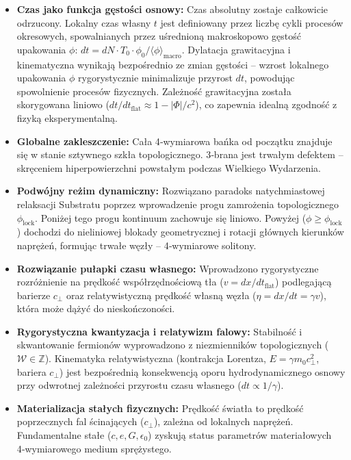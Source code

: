 \documentclass[
  letterpaper,
  DIV=11,
  numbers=noendperiod]{scrartcl}
\providecommand{\tightlist}{%
  \setlength{\itemsep}{0pt}\setlength{\parskip}{0pt}}
\numberwithin{equation}{subsection}
\begin{document}
\begin{itemize}
\tightlist
\item
  \textbf{Czas jako funkcja gęstości osnowy:} Czas absolutny zostaje
  całkowicie odrzucony. Lokalny czas własny \(t\) jest definiowany przez
  liczbę cykli procesów okresowych, spowalnianych przez uśrednioną
  makroskopowo gęstość upakowania \(\phi\):
  \(dt = dN \cdot T_0 \cdot \phi_0/\langle\phi\rangle_{\text{macro}}\).
  Dylatacja grawitacyjna i kinematyczna wynikają bezpośrednio ze zmian
  gęstości -- wzrost lokalnego upakowania \(\phi\) rygorystycznie
  minimalizuje przyrost \(dt\), powodując spowolnienie procesów
  fizycznych. Zależność grawitacyjna została skorygowana liniowo
  (\(dt/dt_{\text{flat}} \approx 1 - |\Phi|/c^2\)), co zapewnia idealną
  zgodność z fizyką eksperymentalną.
\item
  \textbf{Globalne zakleszczenie:} Cała 4‑wymiarowa bańka od początku
  znajduje się w stanie sztywnego szkła topologicznego. 3‑brana jest
  trwałym defektem -- skręceniem hiperpowierzchni powstałym podczas
  Wielkiego Wydarzenia.
\item
  \textbf{Podwójny reżim dynamiczny:} Rozwiązano paradoks
  natychmiastowej relaksacji Substratu poprzez wprowadzenie progu
  zamrożenia topologicznego \(\phi_{\text{lock}}\). Poniżej tego progu
  kontinuum zachowuje się liniowo. Powyżej
  (\(\phi \ge \phi_{\text{lock}}\)) dochodzi do nieliniowej blokady
  geometrycznej i rotacji głównych kierunków naprężeń, formując trwałe
  węzły -- 4‑wymiarowe solitony.
\item
  \textbf{Rozwiązanie pułapki czasu własnego:} Wprowadzono rygorystyczne
  rozróżnienie na prędkość współrzędnościową tła
  (\(v = dx/dt_{\text{flat}}\)) podlegającą barierze \(c_{\perp}\) oraz
  relatywistyczną prędkość własną węzła (\(\eta = dx/dt = \gamma v\)),
  która może dążyć do nieskończoności.
\item
  \textbf{Rygorystyczna kwantyzacja i relatywizm falowy:} Stabilność i
  skwantowanie fermionów wyprowadzono z niezmienników topologicznych
  (\(\mathcal{W} \in \mathbb{Z}\)). Kinematyka relatywistyczna
  (kontrakcja Lorentza, \(E = \gamma m_0 c_{\perp}^2\), bariera
  \(c_{\perp}\)) jest bezpośrednią konsekwencją oporu hydrodynamicznego
  osnowy przy odwrotnej zależności przyrostu czasu własnego
  (\(dt \propto 1/\gamma\)).
\item
  \textbf{Materializacja stałych fizycznych:} Prędkość światła to
  prędkość poprzecznych fal ścinających (\(c_{\perp}\)), zależna od
  lokalnych naprężeń. Fundamentalne stałe (\(c, e, G, \epsilon_0\))
  zyskują status parametrów materiałowych 4‑wymiarowego medium
  sprężystego.
\end{itemize}
\end{document}
